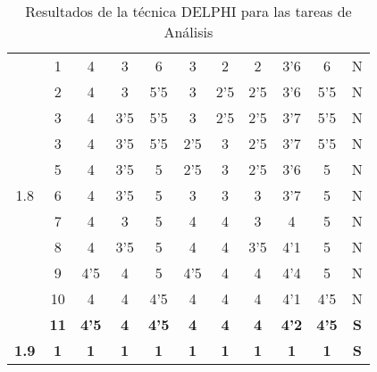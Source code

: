 \documentclass[11pt,a4paper,spanish,twoside]{report}
\begin{document}
\begin{table}[!h]
\begin{tabular}{|c|c||c|c|c|c|c||c|c|c||c|}
    \multirow{11}{*}{1.8} & 1 & 4 & 3 & 6 & 3 & 2 & 2 & 3'6 & 6   & N \\
    & 2 & 4 & 3   & 5'5 & 3   & 2'5 & 2'5 & 3'6 & 5'5 & N \\
    & 3 & 4 & 3'5 & 5'5 & 3   & 2'5 & 2'5 & 3'7 & 5'5 & N \\
    & 3 & 4 & 3'5 & 5'5 & 2'5 & 3   & 2'5 & 3'7 & 5'5 & N \\
    & 5 & 4 & 3'5 & 5   & 2'5 & 3   & 2'5 & 3'6 & 5   & N \\
    & 6 & 4 & 3'5 & 5   & 3   & 3   & 3   & 3'7 & 5   & N \\
    & 7 & 4 & 3   & 5   & 4   & 4   & 3   & 4   & 5   & N \\
    & 8 & 4 & 3'5 & 5   & 4   & 4   & 3'5 & 4'1 & 5   & N \\
    & 9 & 4'5 & 4 & 5 & 4'5 & 4 & 4 & 4'4 & 5 & N \\
    & 10 & 4 & 4 & 4'5 & 4 & 4 & 4 & 4'1 & 4'5 & N \\
    & \textbf{11} & \textbf{4'5} & \textbf{4} & \textbf{4'5} & \textbf{4} & \textbf{4} & \textbf{4} & \textbf{4'2} & \textbf{4'5} & \textbf{S} \\
    \hline

    \textbf{1.9} & \textbf{1} & \textbf{1} & \textbf{1} & \textbf{1} & \textbf{1} & \textbf{1} & \textbf{1} & \textbf{1} & \textbf{1} & \textbf{S} \\
    \hline
  \end{tabular}
  \caption{Resultados de la técnica DELPHI para las tareas de
    Análisis} \label{Tab:anal}
\end{table}
\end{document}
